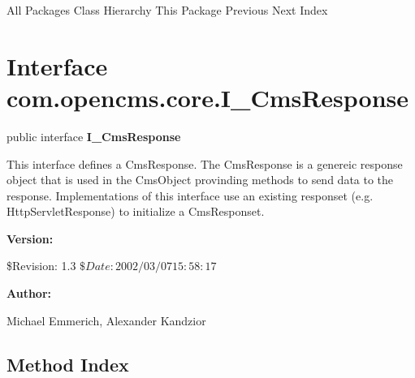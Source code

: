 \begin{PRE}
All Packages  Class Hierarchy  This Package  Previous  Next  Index
\end{PRE}

\htmlHR

\section*{  Interface com.opencms.core.I\_CmsResponse }

\begin{description}
\item public interface {\bf I\_CmsResponse} 
\end{description}

This interface defines a CmsResponse. The CmsResponse is a genereic response
object that is used in the CmsObject provinding methods to send data to the
response. Implementations of this interface use an existing responset (e.g.
HttpServletResponse) to initialize a CmsResponset. 

\begin{description}
\item {\bf Version:}  

\$Revision: 1.3 $ \$Date: 2002/03/07 15:58:17 $  
\item {\bf Author:}  

Michael Emmerich, Alexander Kandzior 
\end{description}

\htmlHR

\subsection*{  Method Index }

